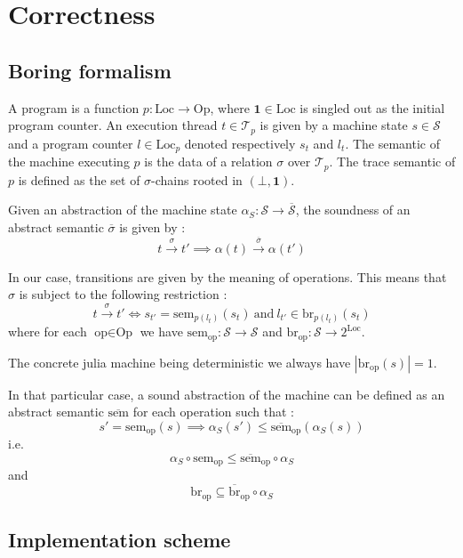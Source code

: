 \documentclass[14pt]{article}
\begin{document}
\section{Correctness}

\subsection{Boring formalism}

A program is a function $p:\text{Loc}\to\text{Op}$, where $\mathbf{1} \in \text{Loc}$ is singled out as the initial program counter. An execution thread $t\in\mathcal{T}_p$ is given by a machine state $s\in\mathcal{S}$ and a program counter $l\in\text{Loc}_p$ denoted respectively $s_t$ and $l_t$.
The semantic of the machine executing $p$ is the data of a relation $\sigma$ over $\mathcal{T}_p$. The trace semantic of $p$ is defined as the set of $\sigma$-chains rooted in $(\bot,\mathbf{1})$.

Given an abstraction of the machine state $\alpha_S : \mathcal{S}\to\overline{\mathcal{S}}$, the soundness of an abstract semantic $\overline{\sigma}$ is given by :
\[ t \xrightarrow{\sigma} t'  \implies \alpha(t) \xrightarrow{\overline{\sigma}} \alpha(t') \]

In our case, transitions are given by the meaning of operations. This means that $\sigma$ is subject to the following restriction :
\[ t \xrightarrow{\sigma} t' \iff s_{t'} = \text{sem}_{p(l_t)}(s_t) ~\text{and}~ l_{t'} \in \text{br}_{p(l_t)}(s_t)\]
where for each $\text{op} \in \text{Op}$ we have $\text{sem}_{\text{op}} : \mathcal{S}\to\mathcal{S}$ and $\text{br}_{\text{op}} : \mathcal{S} \to 2^\text{Loc}$.

The concrete julia machine being deterministic we always have $|\text{br}_{\text{op}}(s)|=1$.

In that particular case, a sound abstraction of the machine can be defined as an abstract semantic $\overline{\text{sem}}$ for each operation such that :
\[ s' = \text{sem}_{\text{op}}(s) \implies \alpha_S(s') \leq \overline{\text{sem}}_{\text{op}}(\alpha_S(s)) \]
i.e.
\[ \alpha_S \circ \text{sem}_{\text{op}} \leq \overline{\text{sem}}_{\text{op}} \circ \alpha_S \]
and
\[ \text{br}_{\text{op}} \subseteq \overline{\text{br}}_{\text{op}} \circ \alpha_S \]

\subsection{Implementation scheme}
\end{document}
